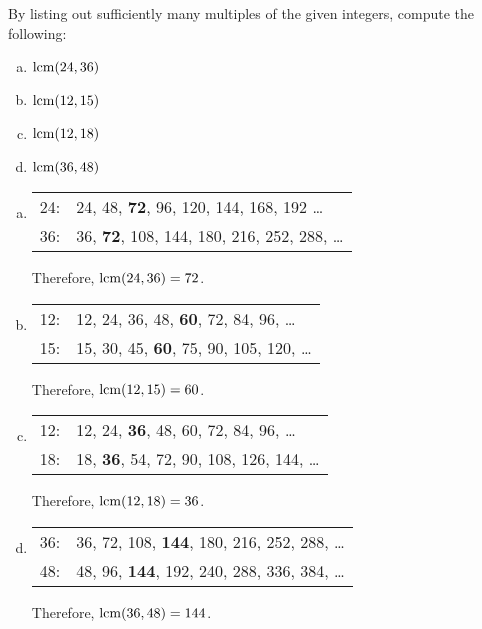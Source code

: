 \documentclass[11pt,letterpaper]{article}
\begin{document}
 By listing out sufficiently many multiples of the given integers, compute the following:
	\begin{enumerate}[(a)]
	\item $\operatorname{lcm}(24, 36)$
	\item $\operatorname{lcm}(12, 15)$
	\item $\operatorname{lcm}(12, 18)$
	\item $\operatorname{lcm}(36, 48)$
	\end{enumerate} \pspace

\sol
\begin{enumerate}[(a)]
\item  \phantom{.}\par
	\begin{table}[!ht]
	\centering
	\begin{tabular}{rl}
	24: & 24, 48, \textbf{72}, 96, 120, 144, 168, 192 \ldots \\
	36: & 36, \textbf{72}, 108, 144, 180, 216, 252, 288, \ldots
	\end{tabular}
	\end{table} \par 
Therefore, $\operatorname{lcm}(24, 36)= 72$. \pspace

\item  \phantom{.}\par
	\begin{table}[!ht]
	\centering
	\begin{tabular}{rl}
	12: & 12, 24, 36, 48, \textbf{60}, 72, 84, 96, \ldots \\
	15: & 15, 30, 45, \textbf{60}, 75, 90, 105, 120, \ldots
	\end{tabular}
	\end{table} \par 
Therefore, $\operatorname{lcm}(12, 15)= 60$. \pspace
 
\item  \phantom{.}\par
	\begin{table}[!ht]
	\centering
	\begin{tabular}{rl}
	12: & 12, 24, \textbf{36}, 48, 60, 72, 84, 96, \ldots \\
	18: & 18, \textbf{36}, 54, 72, 90, 108, 126, 144, \ldots
	\end{tabular}
	\end{table} \par 
Therefore, $\operatorname{lcm}(12, 18)= 36$. \pspace
 
\item  \phantom{.}\par
	\begin{table}[!ht]
	\centering
	\begin{tabular}{rl}
	36: & 36, 72, 108, \textbf{144}, 180, 216, 252, 288, \ldots \\
	48: & 48, 96, \textbf{144}, 192, 240, 288, 336, 384, \ldots
	\end{tabular}
	\end{table} \par  
Therefore, $\operatorname{lcm}(36, 48)= 144$. \pspace
\end{enumerate}
\end{document}
